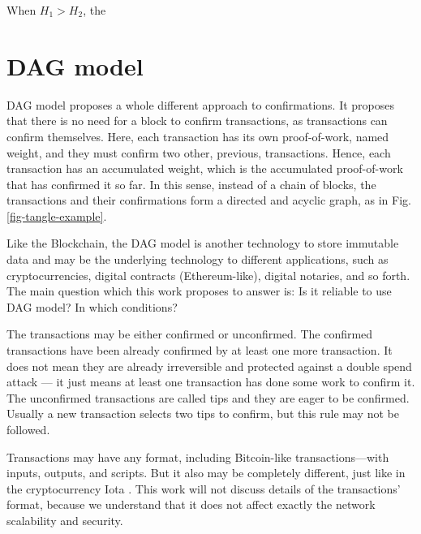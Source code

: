 \begin{theorem}
	When $H_1 > H_2$, the
\end{theorem}





\chapter{DAG model}

DAG model proposes a whole different approach to confirmations. It proposes that there is no need for a block to confirm transactions, as transactions can confirm themselves. Here, each transaction has its own proof-of-work, named weight, and they must confirm two other, previous, transactions. Hence, each transaction has an accumulated weight, which is the accumulated proof-of-work that has confirmed it so far. In this sense, instead of a chain of blocks, the transactions and their confirmations form a directed and acyclic graph, as in Fig. \ref{fig-tangle-example}.

Like the Blockchain, the DAG model is another technology to store immutable data and may be the underlying technology to different applications, such as cryptocurrencies, digital contracts (Ethereum-like), digital notaries, and so forth. The main question which this work proposes to answer is: Is it reliable to use DAG model? In which conditions?

The transactions may be either confirmed or unconfirmed. The confirmed transactions have been already confirmed by at least one more transaction. It does not mean they are already irreversible and protected against a double spend attack --- it just means at least one transaction has done some work to confirm it. The unconfirmed transactions are called tips and they are eager to be confirmed. Usually a new transaction selects two tips to confirm, but this rule may not be followed.

Transactions may have any format, including Bitcoin-like transactions---with inputs, outputs, and scripts. But it also may be completely different, just like in the cryptocurrency Iota \citep{tangle2016}. This work will not discuss details of the transactions' format, because we understand that it does not affect exactly the network scalability and security.

